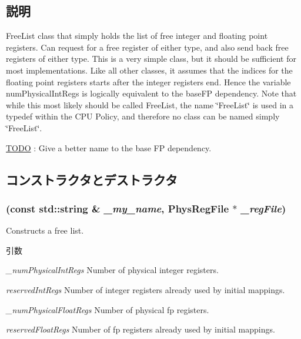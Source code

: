 \subsection{説明}
FreeList class that simply holds the list of free integer and floating point registers. Can request for a free register of either type, and also send back free registers of either type. This is a very simple class, but it should be sufficient for most implementations. Like all other classes, it assumes that the indices for the floating point registers starts after the integer registers end. Hence the variable numPhysicalIntRegs is logically equivalent to the baseFP dependency. Note that while this most likely should be called FreeList, the name \char`\"{}FreeList\char`\"{} is used in a typedef within the CPU Policy, and therefore no class can be named simply \char`\"{}FreeList\char`\"{}. \begin{Desc}
\item[\hyperlink{todo__todo000029}{TODO}]: Give a better name to the base FP dependency. \end{Desc}


\subsection{コンストラクタとデストラクタ}
\hypertarget{classUnifiedFreeList_a8ebdff68d322a016350547d0d1857cee}{
\subsubsection[{UnifiedFreeList}]{ (const std::string \& {\em \_\-my\_\-name}, \/  {\bf PhysRegFile} $\ast$ {\em \_\-regFile})}}
\label{classUnifiedFreeList_a8ebdff68d322a016350547d0d1857cee}
Constructs a free list. 
\begin{DoxyParams}{引数}
\item[{\em \_\-numPhysicalIntRegs}]Number of physical integer registers. \item[{\em reservedIntRegs}]Number of integer registers already used by initial mappings. \item[{\em \_\-numPhysicalFloatRegs}]Number of physical fp registers. \item[{\em reservedFloatRegs}]Number of fp registers already used by initial mappings. \end{DoxyParams}



